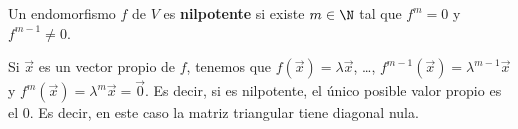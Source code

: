 \begin{fdefinition}[]
\normalfont Un endomorfismo $\displaystyle f $ de $\displaystyle V $ es \textbf{nilpotente} si existe $\displaystyle m \in \N $ tal que $\displaystyle f^{m} = 0 $ y $\displaystyle f^{m - 1} \neq 0 $. 
\end{fdefinition}
\begin{observation}
\normalfont Si $\displaystyle \vec{x}  $ es un vector propio de $\displaystyle f $, tenemos que $\displaystyle f\left(\vec{x}\right) = \lambda \vec{x} $, \ldots, $\displaystyle f^{m - 1}\left(\vec{x}\right) = \lambda^{m - 1}\vec{x} $ y $\displaystyle f^{m}\left(\vec{x}\right) =\lambda^{m}\vec{x}=\vec{0} $. Es decir, si es nilpotente, el único posible valor propio es el 0. Es decir, en este caso la matriz triangular tiene diagonal nula.
\end{observation}
